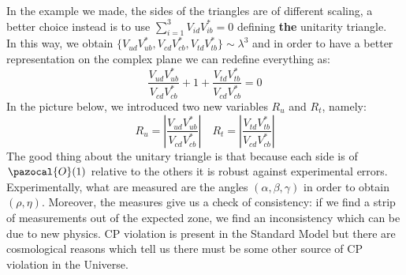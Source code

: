 \documentclass[../main.tex]{subfiles}
\begin{document}
In the example we made, the sides of the triangles are of different scaling, a better choice instead is to use $\sum_{i=1}^3V_{id}V_{ib}^*=0$ defining \textbf{the} unitarity triangle.\\
In this way, we obtain $\{V_{ud}V_{ub}^*,V_{cd}V_{cb}^*,V_{td}V_{tb}^*\}\sim\lambda^3$ and in order to have a better representation on the complex plane we can redefine everything as:
\[
\frac{V_{ud}V_{ub}^*}{V_{cd}V_{cb}^*}+1+\frac{V_{td}V_{tb}^*}{V_{cd}V_{cb}^*}=0
\]
In the picture below, we introduced two new variables $R_u$ and $R_t$, namely:
\[
R_u=\left|\frac{V_{ud}V_{ub}^*}{V_{cd}V_{cb}^*}\right| \quad R_t=\left|\frac{V_{td}V_{tb}^*}{V_{cd}V_{cb}^*}\right|
\]
The good thing about the unitary triangle is that because each side is of $\pazocal{O}(1)$ relative to the others it is robust against experimental errors.\\
Experimentally, what are measured are the angles $(\alpha,\beta,\gamma)$ in order to obtain $(\rho,\eta)$. Moreover, the measures give us a check of consistency: if we find a strip of measurements out of the expected zone, we find an inconsistency which can be due to new physics. CP violation is present in the Standard Model but there are cosmological reasons which tell us there must be some other source of CP violation in the Universe.
\end{document}

